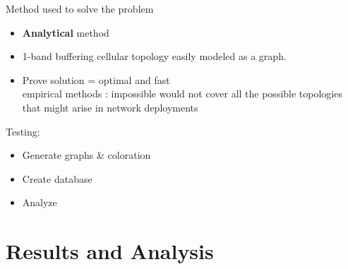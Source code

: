 \documentclass{beamer}
\begin{document}
\begin{frame}{Method used to solve the problem}

\begin{itemize}
  \item \textbf{Analytical} method
  \item 1-band buffering cellular topology \textrightarrow{} easily modeled as a graph.
  \item Prove solution = optimal and fast\\
  \textrightarrow{} empirical methods : impossible 
  would not cover all the possible topologies that might arise in network deployments
\end{itemize}

\vskip 1cm

\pause

Testing:
\begin{itemize}
  \item Generate graphs \& coloration
  \item Create database
  \item Analyze
\end{itemize}

\end{frame}


\section{Results and Analysis}
\end{document}
